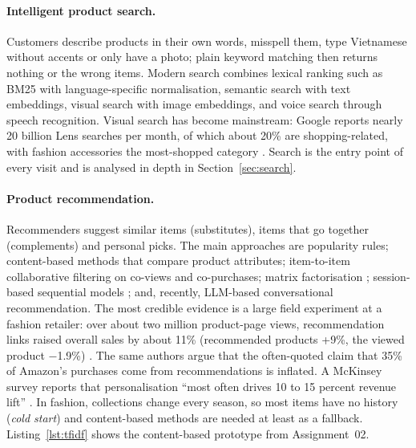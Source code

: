 \paragraph{Intelligent product search.} Customers describe products in their own words, misspell them, type Vietnamese without accents or only have a photo; plain keyword matching then returns nothing or the wrong items. Modern search combines lexical ranking such as BM25 \cite{robertson2009} with language-specific normalisation, semantic search with text embeddings, visual search with image embeddings, and voice search through speech recognition. Visual search has become mainstream: Google reports nearly 20 billion Lens searches per month, of which about 20\% are shopping-related, with fashion accessories the most-shopped category \cite{lens2024}. Search is the entry point of every visit and is analysed in depth in Section~\ref{sec:search}.

\paragraph{Product recommendation.} Recommenders suggest similar items (substitutes), items that go together (complements) and personal picks. The main approaches are popularity rules; content-based methods that compare product attributes; item-to-item collaborative filtering on co-views and co-purchases; matrix factorisation \cite{koren2009}; session-based sequential models \cite{hidasi2016}; and, recently, LLM-based conversational recommendation. The most credible evidence is a large field experiment at a fashion retailer: over about two million product-page views, recommendation links raised overall sales by about 11\% (recommended products +9\%, the viewed product $-$1.9\%) \cite{kumar2019}. The same authors argue that the often-quoted claim that 35\% of Amazon's purchases come from recommendations is inflated. A McKinsey survey reports that personalisation ``most often drives 10 to 15 percent revenue lift'' \cite{mckinsey2021}. In fashion, collections change every season, so most items have no history (\emph{cold start}) and content-based methods are needed at least as a fallback. Listing~\ref{lst:tfidf} shows the content-based prototype from Assignment~02.

